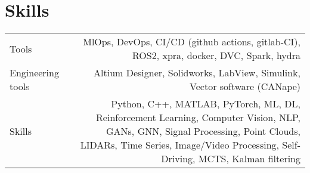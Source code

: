 \section*{\sectionformat Skills}
\begin{tabular}{@{}L!{\VRule}R}
    Tools             & MlOps, DevOps, CI/CD (github actions, gitlab-CI), ROS2, xpra, docker, DVC, Spark, hydra \\
    Engineering tools & Altium Designer, Solidworks, LabView, Simulink, Vector software (CANape)          \\
    Skills            &  Python, C++, MATLAB, PyTorch, ML, DL, Reinforcement Learning, Computer Vision, NLP, GANs, GNN, Signal Processing, Point Clouds, LIDARs, Time Series, Image/Video Processing,  Self-Driving, MCTS, Kalman filtering
    \\
\end{tabular}